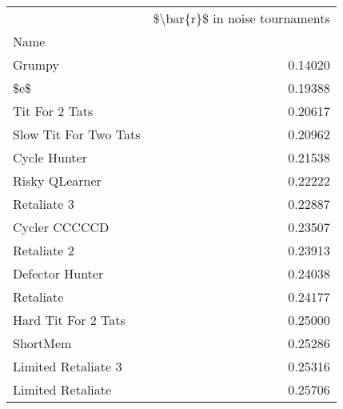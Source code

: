 \begin{tabular}{lr}
\toprule
{} &  \$\textbackslash bar\{r\}\$ in noise tournaments \\
Name                  &                                 \\
\midrule
Grumpy                &                         0.14020 \\
\$e\$                   &                         0.19388 \\
Tit For 2 Tats        &                         0.20617 \\
Slow Tit For Two Tats &                         0.20962 \\
Cycle Hunter          &                         0.21538 \\
Risky QLearner        &                         0.22222 \\
Retaliate 3           &                         0.22887 \\
Cycler CCCCCD         &                         0.23507 \\
Retaliate 2           &                         0.23913 \\
Defector Hunter       &                         0.24038 \\
Retaliate             &                         0.24177 \\
Hard Tit For 2 Tats   &                         0.25000 \\
ShortMem              &                         0.25286 \\
Limited Retaliate 3   &                         0.25316 \\
Limited Retaliate     &                         0.25706 \\
\bottomrule
\end{tabular}

